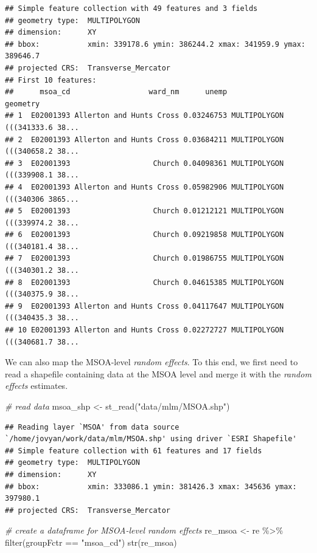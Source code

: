 \documentclass[
]{book}
\newenvironment{Shaded}{\begin{snugshade}}{\end{snugshade}}
\newcommand{\CommentTok}[1]{\textcolor[rgb]{0.56,0.35,0.01}{\textit{#1}}}
\newcommand{\FunctionTok}[1]{\textcolor[rgb]{0.00,0.00,0.00}{#1}}
\newcommand{\NormalTok}[1]{#1}
\newcommand{\OtherTok}[1]{\textcolor[rgb]{0.56,0.35,0.01}{#1}}
\newcommand{\SpecialCharTok}[1]{\textcolor[rgb]{0.00,0.00,0.00}{#1}}
\newcommand{\StringTok}[1]{\textcolor[rgb]{0.31,0.60,0.02}{#1}}
\begin{document}
\begin{verbatim}
## Simple feature collection with 49 features and 3 fields
## geometry type:  MULTIPOLYGON
## dimension:      XY
## bbox:           xmin: 339178.6 ymin: 386244.2 xmax: 341959.9 ymax: 389646.7
## projected CRS:  Transverse_Mercator
## First 10 features:
##      msoa_cd                  ward_nm      unemp                       geometry
## 1  E02001393 Allerton and Hunts Cross 0.03246753 MULTIPOLYGON (((341333.6 38...
## 2  E02001393 Allerton and Hunts Cross 0.03684211 MULTIPOLYGON (((340658.2 38...
## 3  E02001393                   Church 0.04098361 MULTIPOLYGON (((339908.1 38...
## 4  E02001393 Allerton and Hunts Cross 0.05982906 MULTIPOLYGON (((340306 3865...
## 5  E02001393                   Church 0.01212121 MULTIPOLYGON (((339974.2 38...
## 6  E02001393                   Church 0.09219858 MULTIPOLYGON (((340181.4 38...
## 7  E02001393                   Church 0.01986755 MULTIPOLYGON (((340301.2 38...
## 8  E02001393                   Church 0.04615385 MULTIPOLYGON (((340375.9 38...
## 9  E02001393 Allerton and Hunts Cross 0.04117647 MULTIPOLYGON (((340435.3 38...
## 10 E02001393 Allerton and Hunts Cross 0.02272727 MULTIPOLYGON (((340681.7 38...
\end{verbatim}

We can also map the MSOA-level \emph{random effects}. To this end, we first need to read a shapefile containing data at the MSOA level and merge it with the \emph{random effects} estimates.

\begin{Shaded}
\begin{Highlighting}[]
\CommentTok{\# read data}
\NormalTok{msoa\_shp }\OtherTok{\textless{}{-}} \FunctionTok{st\_read}\NormalTok{(}\StringTok{"data/mlm/MSOA.shp"}\NormalTok{)}
\end{Highlighting}
\end{Shaded}

\begin{verbatim}
## Reading layer `MSOA' from data source `/home/jovyan/work/data/mlm/MSOA.shp' using driver `ESRI Shapefile'
## Simple feature collection with 61 features and 17 fields
## geometry type:  MULTIPOLYGON
## dimension:      XY
## bbox:           xmin: 333086.1 ymin: 381426.3 xmax: 345636 ymax: 397980.1
## projected CRS:  Transverse_Mercator
\end{verbatim}

\begin{Shaded}
\begin{Highlighting}[]
\CommentTok{\# create a dataframe for MSOA{-}level random effects}
\NormalTok{re\_msoa }\OtherTok{\textless{}{-}}\NormalTok{ re }\SpecialCharTok{\%\textgreater{}\%} \FunctionTok{filter}\NormalTok{(groupFctr }\SpecialCharTok{==} \StringTok{"msoa\_cd"}\NormalTok{)}
\FunctionTok{str}\NormalTok{(re\_msoa)}
\end{Highlighting}
\end{Shaded}
\end{document}
